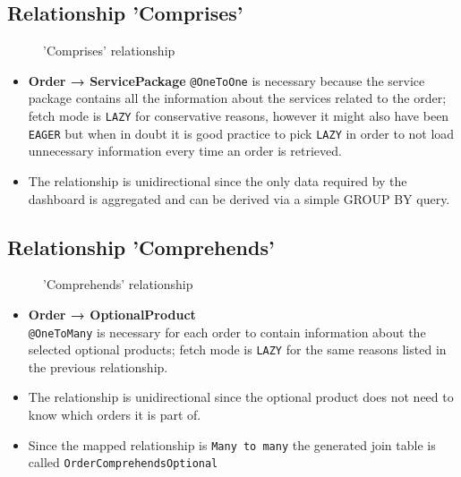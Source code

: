 \subsection*{Relationship 'Comprises'}

\begin{minipage}[h]{0.5\textwidth}
    \begin{figure}[H]
        
        \caption{'Comprises' relationship}
        \label{fig:orm_o_sp}
    \end{figure}
\end{minipage}
\hfill
\begin{minipage}[h]{0.48\textwidth}
    \begin{itemize}
        \item \textbf{Order → ServicePackage} \texttt{@OneToOne} is necessary because the service package contains all the information about the services related to the order; fetch mode is \texttt{LAZY} for conservative reasons, however it might also have been \texttt{EAGER} but when in doubt it is good practice to pick \texttt{LAZY} in order to not load unnecessary information every time an order is retrieved.
        \item The relationship is unidirectional since the only data required by the dashboard is aggregated and can be derived via a simple GROUP BY query.
    \end{itemize}
\end{minipage}

\subsection*{Relationship 'Comprehends'}

\begin{minipage}[h]{0.5\textwidth}
    \begin{figure}[H]
        
        \caption{'Comprehends' relationship}
        \label{fig:orm_o_op}
    \end{figure}
\end{minipage}
\hfill
\begin{minipage}[h]{0.48\textwidth}
    \begin{itemize}
        \item \textbf{Order → OptionalProduct} \\ \texttt{@OneToMany} is necessary for each order to contain information about the selected optional products; fetch mode is \texttt{LAZY} for the same reasons listed in the previous relationship.
        \item The relationship is unidirectional since the optional product does not need to know which orders it is part of.
        \item Since the mapped relationship is \texttt{Many to many} the generated join table is called \texttt{OrderComprehendsOptional}
    \end{itemize}
\end{minipage}


